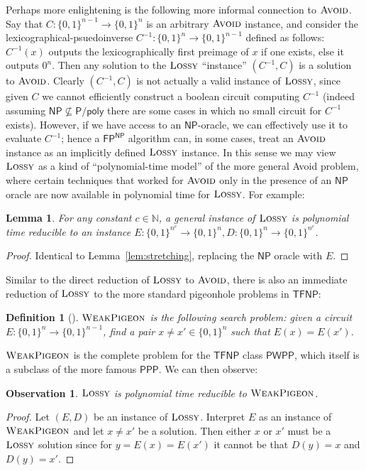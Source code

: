 \documentclass[11pt]{article}
\newtheorem{lemma}{Lemma}
\newtheorem{definition}{Definition}
\newtheorem{observation}{Observation}
\newcommand{\B}{\{0,1\}}
\newcommand{\avoid}{\textsc{Avoid}}
\newcommand{\lossy}{\textsc{Lossy}}
\begin{document}
Perhaps more enlightening is the following more informal connection to $\avoid$. Say that $C: \B^{n-1} \to \B^n$ is an arbitrary $\avoid$ instance, and consider the lexicographical-psuedoinverse $C^{-1}: \B^n \to \B^{n-1}$ defined as follows: $C^{-1}(x)$ outputs the lexicographically first preimage of $x$ if one exists, else it outputs $0^n$. Then any solution to the $\lossy$ ``instance'' $(C^{-1}, C)$ is a solution to $\avoid$. Clearly $(C^{-1},C)$ is not actually a valid instance of $\lossy$, since given $C$ we cannot efficiently construct a boolean circuit computing $C^{-1}$ (indeed assuming $\mathsf{NP} \not\subseteq \mathsf{P/poly}$ there are some cases in which no small circuit for $C^{-1}$ exists). However, if we have access to an $\mathsf{NP}$-oracle, we can effectively use it to evaluate $C^{-1}$; hence a $\mathsf{FP^{NP}}$ algorithm can, in some cases, treat an $\avoid$ instance as an implicitly defined $\lossy$ instance. In this sense we may view $\lossy$ as a kind of ``polynomial-time model'' of the more general Avoid problem, where certain techniques that worked for $\avoid$ only in the presence of an $\mathsf{NP}$ oracle are now available in polynomial time for $\lossy$. For example:
\begin{lemma}
For any constant $c \in \mathbb{N}$, a general instance of $\lossy$ is polynomial time reducible to an instance $E: \B^{n^{c}} \to \B^n, D: \B^n \to \B^{n^{c}}$.
\end{lemma}
\begin{proof}
Identical to Lemma~\ref{lem:stretching}, replacing the $\mathsf{NP}$ oracle with $E$.
\end{proof}

Similar to the direct reduction of $\lossy$ to $\avoid$, there is also an immediate reduction of $\lossy$ to the more standard pigeonhole problems in $\mathsf{TFNP}$:
\begin{definition}[\cite{Jerabek-factoring}]
$\textsc{WeakPigeon}$ is the following search problem: given a circuit $E: \B^n \to \B^{n-1}$, find a pair $x \neq x' \in \B^n$ such that $E(x)=E(x')$.
\end{definition}
$\textsc{WeakPigeon}$ is the complete problem for the $\mathsf{TFNP}$ class $\mathsf{PWPP}$, which itself is a subclass of the more famous $\mathsf{PPP}$. We can then observe:
\begin{observation}
$\textsc{Lossy}$ is polynomial time reducible to $\textsc{WeakPigeon}$.
\end{observation}
\begin{proof}
Let $(E,D)$ be an instance of $\textsc{Lossy}$. Interpret $E$ as an instance of $\textsc{WeakPigeon}$ and let $x \neq x'$ be a solution. Then either $x$ or $x'$ must be a $\textsc{Lossy}$ solution since for $y = E(x)=E(x')$ it cannot be that $D(y) =x$ and $D(y) = x'$.
\end{proof}
\end{document}
